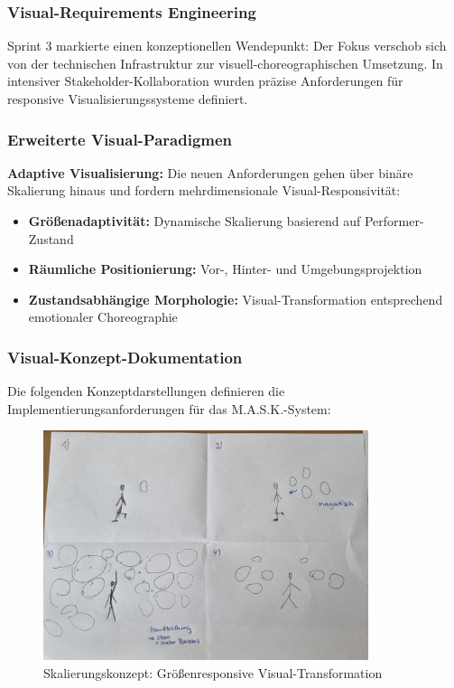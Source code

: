 \subsubsection{Visual-Requirements Engineering}

Sprint 3 markierte einen konzeptionellen Wendepunkt: Der Fokus verschob sich von der technischen Infrastruktur zur visuell-choreographischen Umsetzung. In intensiver Stakeholder-Kollaboration wurden präzise Anforderungen für responsive Visualisierungssysteme definiert.

\subsubsection{Erweiterte Visual-Paradigmen}

\textbf{Adaptive Visualisierung:}
Die neuen Anforderungen gehen über binäre Skalierung hinaus und fordern mehrdimensionale Visual-Responsivität:
\begin{itemize}
    \item \textbf{Größenadaptivität:} Dynamische Skalierung basierend auf Performer-Zustand
    \item \textbf{Räumliche Positionierung:} Vor-, Hinter- und Umgebungsprojektion
    \item \textbf{Zustandsabhängige Morphologie:} Visual-Transformation entsprechend emotionaler Choreographie
\end{itemize}

\subsubsection{Visual-Konzept-Dokumentation}

Die folgenden Konzeptdarstellungen definieren die Implementierungsanforderungen für das M.A.S.K.-System:

\begin{figure}[H]
    \centering
    \includegraphics[width=0.85\textwidth]{images/Sprint3_1.jpg}
    \caption{Skalierungskonzept: Größenresponsive Visual-Transformation}
    \label{fig:scaling_concept}
\end{figure}

